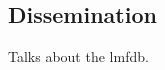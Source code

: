\documentclass[amstex,11pt]{amsart}
\numberwithin{equation}{section}
\newcommand{\Q}{\mathbb Q}
\begin{document}
\subsection{Dissemination}

Talks about the lmfdb.




\begin{comment}
Recent advances to be covered in workshop lectures:

\subsection{Elliptic curves over $\Q(\sqrt{5})$}

William Stein and collaborators have been developing the analogue of
Cremona's tables for elliptic curves over $\Q(\sqrt{5})$.  There are
numerous difficulties which are not present in the rational case:
modularity is not known, given the modular form, the construction of
the corresponding elliptic curve is not known, etc.

One or two lectures by Stein.

\subsection{Hilbert modular forms}

John Voight has made extensive tables of Hilbert modular forms,
primarily over $\Q(\sqrt{5})$ and $\Q(\sqrt{8})$.  The basic
theory, the computational methods, and the associated $L$-functions
(which provide the connection to elliptic curves) will be
described.

One or two lectures by Voight.

\subsection{Hyperelliptic curves}

Kiran Kedlaya and Andrew Sutherland have produced a wide variety
of examples of hyperelliptic curves (primarily genus $2$, but 
genus $3$
calculations will be available by the time of the workshop).

One lecture each by Sutherland and Kedlaya


\end{comment}
\end{document}
